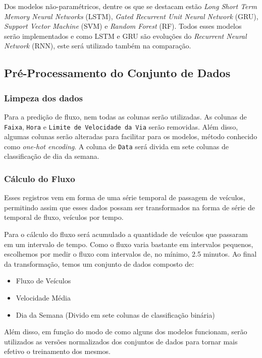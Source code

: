 \documentclass[conference]{IEEEtran}
\begin{document}
Dos modelos não-paramétricos, dentre os que se destacam estão \textit{Long Short Term Memory Neural Networks} (LSTM), \textit{Gated Recurrent Unit Neural Network} (GRU), \textit{Support Vector Machine} (SVM) e \textit{Random Forest} (RF). Todos esses modelos serão implementados e como LSTM e GRU são evoluções do \textit{Recurrent Neural Network} (RNN), este será utilizado também na comparação. 

\subsection{Pré-Processamento do Conjunto de Dados}

\subsubsection{Limpeza dos dados}

Para a predição de fluxo, nem todas as colunas serão utilizadas. As colunas de \texttt{Faixa}, \texttt{Hora} e \texttt{Limite de Velocidade da Via} serão removidas. Além disso, algumas colunas serão alteradas para facilitar para os modelos, método conhecido como \textit{one-hot encoding}. A coluna de \texttt{Data} será divida em sete colunas de classificação de dia da semana.

\subsubsection{Cálculo do Fluxo}

Esses registros vem em forma de uma série temporal de passagem de veículos, permitindo assim que esses dados possam ser transformados na forma de série de temporal de fluxo, veículos por tempo.

Para o cálculo do fluxo será acumulado a quantidade de veículos que passaram em um intervalo de tempo.
Como o fluxo varia bastante em intervalos pequenos, escolhemos por medir o fluxo com intervalos de, no mínimo, 2.5 minutos. Ao final da transformação, temos um conjunto de dados composto de:

\begin{itemize}
    \item Fluxo de Veículos
    \item Velocidade Média
    \item Dia da Semana (Divido em sete colunas de classificação binária)
\end{itemize}

Além disso, em função do modo de como alguns dos modelos funcionam, serão utilizados as versões normalizados dos conjuntos de dados para tornar mais efetivo o treinamento dos mesmos.
\end{document}
